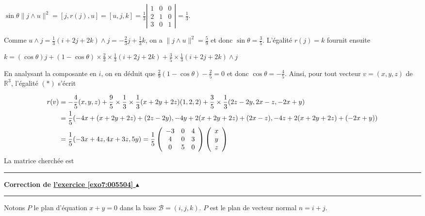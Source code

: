 \documentclass[11pt,a4paper]{article}
\newcommand{\Rr}{\mathbb{R}} \newcommand{\R}{\mathbb{R}}
\newcounter{exo}
\newcommand{\correction}[1]{\hypertarget{cor7:#1}{}\label{cor7:#1}{\bf Correction de \hyperlink{exo7:#1}{l'exercice \ref{exo7:#1} $\blacktriangle$}}\vspace{1mm}\hrule\vspace{1mm}}
\newcommand{\fincorrection}{\vspace{1mm}\hrule\vspace*{7mm}}
\begin{document}
\begin{center}
$\sin\theta\|j\wedge u\|^2=\left[j,r(j),u\right]=\left[u,j,k\right]=\frac{1}{3}\left|\begin{array}{ccc}
1&0&0\\
2&1&0\\
3&0&1
\end{array}
\right|=\frac{1}{3}$.
\end{center}

Comme $u\wedge j=\frac{1}{3}(i+2j+2k)\wedge j=-\frac{2}{3}j+\frac{1}{3}k$, on a $\|j\wedge u\|^2=\frac{5}{9}$ et donc $\sin\theta=\frac{3}{5}$. L'égalité $r(j)=k$ fournit ensuite

\begin{center}
$k=(\cos\theta)j+(1-\cos\theta)\times\frac{2}{3}\times\frac{1}{3}(i+2j+2k)+\frac{3}{5}\times\frac{1}{3}(i+2j+2k)\wedge j$
\end{center}
En analysant la composante en $i$, on en déduit que $\frac{2}{9}(1-\cos\theta)-\frac{2}{5}=0$ et donc $\cos\theta=-\frac{4}{5}$. Ainsi, pour tout vecteur $v=(x,y,z)$ de $\Rr^3$, l'égalité $(*)$ s'écrit

\begin{align*}\ensuremath
r(v)&=-\frac{4}{5}(x,y,z)+\frac{9}{5}\times\frac{1}{3}\times\frac{1}{3}(x+2y+2z)(1,2,2)+\frac{3}{5}\times\frac{1}{3}
(2z-2y,2x-z,-2x+y)\\
 &=\frac{1}{5}(-4x+(x+2y+2z)+(2z-2y),-4y+2(x+2y+2z)+(2x-z),-4z+2(x+2y+2z)+(-2x+y))\\
 &=\frac{1}{5}(-3x+4z,4x+3z,5y)=\frac{1}{5}\left(
 \begin{array}{ccc}
 -3&0&4\\
 4&0&3\\
 0&5&0
 \end{array}
 \right)\left(
 \begin{array}{c}
 x\\
 y\\
 z
 \end{array}
 \right)
\end{align*}
La matrice cherchée est

\begin{center}
 \end{center}
\fincorrection
\correction{005504}
Notons $P$ le plan d'équation $x+y=0$ dans la base $\mathcal{B}=(i,j,k)$. $P$ est le plan de vecteur normal $n=i+j$.
\end{document}
